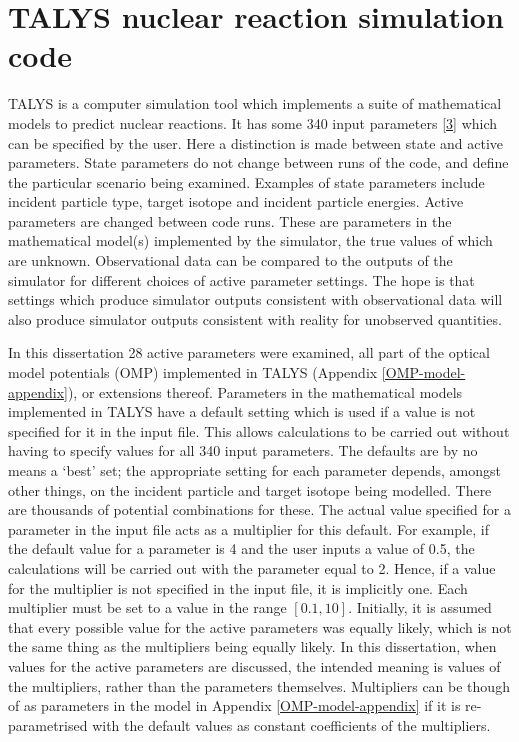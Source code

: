 \documentclass[
  12pt,
  a4paper,
  twoside]{book}
\begin{document}
\hypertarget{Background:talys}{%
\section{TALYS nuclear reaction simulation code}\label{Background:talys}}

TALYS is a computer simulation tool which implements a suite of mathematical models to predict nuclear reactions. It has some 340 input parameters \protect\hyperlink{ref-talys}{{[}3{]}} which can be specified by the user. Here a distinction is made between state and active parameters. State parameters do not change between runs of the code, and define the particular scenario being examined. Examples of state parameters include incident particle type, target isotope and incident particle energies. Active parameters are changed between code runs. These are parameters in the mathematical model(s) implemented by the simulator, the true values of which are unknown. Observational data can be compared to the outputs of the simulator for different choices of active parameter settings. The hope is that settings which produce simulator outputs consistent with observational data will also produce simulator outputs consistent with reality for unobserved quantities.

In this dissertation 28 active parameters were examined, all part of the optical model potentials (OMP) implemented in TALYS (Appendix \ref{OMP-model-appendix}), or extensions thereof. Parameters in the mathematical models implemented in TALYS have a default setting which is used if a value is not specified for it in the input file. This allows calculations to be carried out without having to specify values for all 340 input parameters. The defaults are by no means a `best' set; the appropriate setting for each parameter depends, amongst other things, on the incident particle and target isotope being modelled. There are thousands of potential combinations for these. The actual value specified for a parameter in the input file acts as a multiplier for this default. For example, if the default value for a parameter is 4 and the user inputs a value of 0.5, the calculations will be carried out with the parameter equal to 2. Hence, if a value for the multiplier is not specified in the input file, it is implicitly one. Each multiplier must be set to a value in the range \([0.1,10]\). Initially, it is assumed that every possible value for the active parameters was equally likely, which is not the same thing as the multipliers being equally likely. In this dissertation, when values for the active parameters are discussed, the intended meaning is values of the multipliers, rather than the parameters themselves. Multipliers can be though of as parameters in the model in Appendix \ref{OMP-model-appendix} if it is re-parametrised with the default values as constant coefficients of the multipliers.
\end{document}
